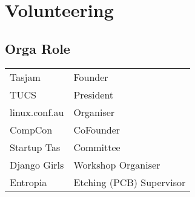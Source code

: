 \documentclass[a4paper]{deedy-resume_twopage} %
\begin{document}
\begin{minipage}[t]{0.25\textwidth} %





  \section{Volunteering}

  \subsection{Orga Role}
  \begin{tabular}{l p{}}
  Tasjam & Founder \\
  TUCS & President \\
  linux.conf.au & Organiser \\ %
  CompCon & CoFounder \\
  Startup Tas & Committee \\
  Django Girls & Workshop Organiser \\
  Entropia & Etching (PCB) Supervisor \\
  \end{tabular}


\end{minipage}
\end{document}
